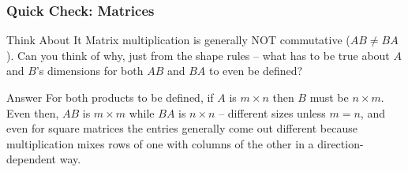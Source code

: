 \begin{frame}[fragile]\frametitle{Quick Check: Matrices}
\begin{block}{Think About It}
Matrix multiplication is generally NOT commutative ($AB \neq BA$). Can you think of why, just from the shape rules -- what has to be true about $A$ and $B$'s dimensions for both $AB$ and $BA$ to even be defined?
\end{block}
\pause
\begin{block}{Answer}
For both products to be defined, if $A$ is $m\times n$ then $B$ must be $n\times m$. Even then, $AB$ is $m\times m$ while $BA$ is $n\times n$ -- different sizes unless $m=n$, and even for square matrices the entries generally come out different because multiplication mixes rows of one with columns of the other in a direction-dependent way.
\end{block}
\end{frame}









